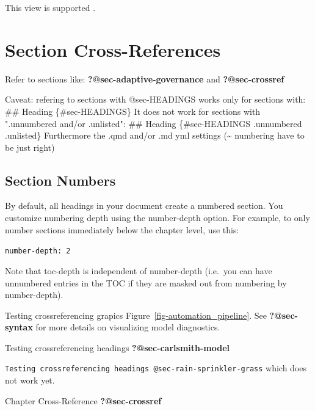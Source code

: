 \documentclass[
  11pt,
  letterpaper,
]{book}
\newenvironment{Shaded}{\begin{snugshade}}{\end{snugshade}}
\newcommand{\AnnotationTok}[1]{\textcolor[rgb]{0.37,0.37,0.37}{#1}}
\newcommand{\CommentTok}[1]{\textcolor[rgb]{0.37,0.37,0.37}{#1}}
\newcommand{\FunctionTok}[1]{\textcolor[rgb]{0.28,0.35,0.67}{#1}}
\newcommand{\NormalTok}[1]{\textcolor[rgb]{0.00,0.23,0.31}{#1}}
\begin{document}
This view is supported \autocites[23]{soares2014}[156-159]{knuth1984}.

\section*{Section Cross-References}\label{sec-crossref}


Refer to sections like: \textbf{?@sec-adaptive-governance} and
\textbf{?@sec-crossref}

\begin{Shaded}
\begin{Highlighting}[]
\AnnotationTok{Caveat:}\CommentTok{ refering to sections with @sec{-}HEADINGS works only for sections with:}
\FunctionTok{\#\# Heading \{\#sec{-}HEADINGS\}}
\NormalTok{It does not work for sections with ".unnumbered and/or .unlisted":}
\FunctionTok{\#\# Heading \{\#sec{-}HEADINGS .unnumbered .unlisted\}}
\NormalTok{Furthermore the .qmd and/or .md yml settings (\textasciitilde{} numbering have to be just right)}
\end{Highlighting}
\end{Shaded}

\subsection*{Section Numbers}\label{section-numbers}

By default, all headings in your document create a numbered section. You
customize numbering depth using the number-depth option. For example, to
only number sections immediately below the chapter level, use this:

\texttt{number-depth:\ 2}

Note that toc-depth is independent of number-depth (i.e.~you can have
unnumbered entries in the TOC if they are masked out from numbering by
number-depth).

Testing crossreferencing grapics Figure~\ref{fig-automation_pipeline}.
See \textbf{?@sec-syntax} for more details on visualizing model
diagnostics.

Testing crossreferencing headings \textbf{?@sec-carlsmith-model}

\texttt{Testing\ crossreferencing\ headings\ @sec-rain-sprinkler-grass}
which does not work yet.

Chapter Cross-Reference \textbf{?@sec-crossref}
\end{document}
